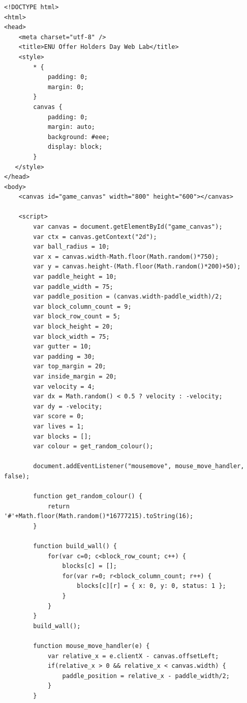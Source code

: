 \documentclass[10pt, a4paper, oneside]{article}
\begin{document}
\begin{lstlisting}
<!DOCTYPE html>
<html>
<head>
    <meta charset="utf-8" />
    <title>ENU Offer Holders Day Web Lab</title>
    <style>
        * { 
            padding: 0; 
            margin: 0; 
        } 
        canvas { 
            padding: 0; 
            margin: auto; 
            background: #eee; 
            display: block; 
        }
   </style>
</head>
<body>
    <canvas id="game_canvas" width="800" height="600"></canvas>

    <script>
        var canvas = document.getElementById("game_canvas");
        var ctx = canvas.getContext("2d");
        var ball_radius = 10;
        var x = canvas.width-Math.floor(Math.random()*750);
        var y = canvas.height-(Math.floor(Math.random()*200)+50);
        var paddle_height = 10;
        var paddle_width = 75;
        var paddle_position = (canvas.width-paddle_width)/2;
        var block_column_count = 9;
        var block_row_count = 5;
        var block_height = 20;
        var block_width = 75;
        var gutter = 10;
        var padding = 30;
        var top_margin = 20;
        var inside_margin = 20;
        var velocity = 4;
        var dx = Math.random() < 0.5 ? velocity : -velocity;
        var dy = -velocity;
        var score = 0;
        var lives = 1;
        var blocks = [];
        var colour = get_random_colour();

        document.addEventListener("mousemove", mouse_move_handler, false);

        function get_random_colour() {
            return '#'+Math.floor(Math.random()*16777215).toString(16);
        }

        function build_wall() {
            for(var c=0; c<block_row_count; c++) {
                blocks[c] = [];
                for(var r=0; r<block_column_count; r++) {
                    blocks[c][r] = { x: 0, y: 0, status: 1 };
                }
            }
        }
        build_wall();
        
        function mouse_move_handler(e) {
            var relative_x = e.clientX - canvas.offsetLeft;
            if(relative_x > 0 && relative_x < canvas.width) {
                paddle_position = relative_x - paddle_width/2;
            }
        }


\end{lstlisting}
\end{document}
